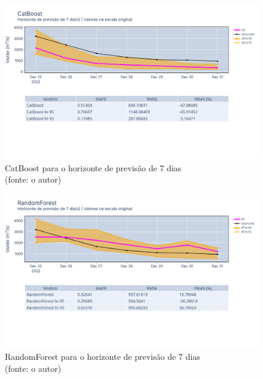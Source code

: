 \begin{figure}[!h]
	\centering
	\includegraphics[scale=0.33]{Figuras/jequiti/resultados/CatBoost_fh7.png}
	\caption{CatBoost para o horizonte de previsão de 7 dias\\(fonte: o autor)}
	\label{fig:jequiti_CatBoostRegressor_fh7}
\end{figure}

\begin{figure}[!h]
	\centering
	\includegraphics[scale=0.33]{Figuras/jequiti/resultados/RandomForest_fh7.png}
	\caption{RandomForest para o horizonte de previsão de 7 dias\\(fonte: o autor)}
	\label{fig:jequiti_RandomForest_fh7}
\end{figure}

